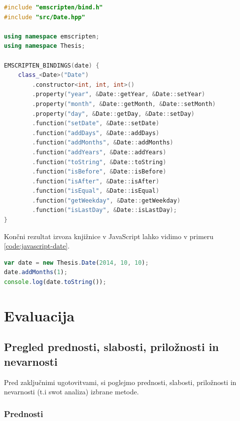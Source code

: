 \begin{lstlisting}[caption={C++ koda za izvoz funckionalnosti knjižnice v JavaScript razreda \texttt{Date}.}, label=code:emscripten-bindings, language=c++]
#include "emscripten/bind.h"
#include "src/Date.hpp"

using namespace emscripten;
using namespace Thesis;

EMSCRIPTEN_BINDINGS(date) {
    class_<Date>("Date")
        .constructor<int, int, int>()
        .property("year", &Date::getYear, &Date::setYear)
        .property("month", &Date::getMonth, &Date::setMonth)
        .property("day", &Date::getDay, &Date::setDay)
        .function("setDate", &Date::setDate)
        .function("addDays", &Date::addDays)
        .function("addMonths", &Date::addMonths)
        .function("addYears", &Date::addYears)
        .function("toString", &Date::toString)
        .function("isBefore", &Date::isBefore)
        .function("isAfter", &Date::isAfter)
        .function("isEqual", &Date::isEqual)
        .function("getWeekday", &Date::getWeekday)
        .function("isLastDay", &Date::isLastDay);
}
\end{lstlisting}

Končni rezultat izvoza knjižnice v JavaScript lahko vidimo v primeru \ref{code:javascript-date}.

\begin{lstlisting}[caption={Primer uporabe izvoženega razreda \texttt{Date} v JavaScript.}, label=code:javascript-date, language=JavaScript]
var date = new Thesis.Date(2014, 10, 10);
date.addMonths(1);
console.log(date.toString());
\end{lstlisting}


\chapter{Evaluacija}
\label{chap:evaluation}

\section{Pregled prednosti, slabosti, priložnosti in nevarnosti}

Pred zaključnimi ugotovitvami, si poglejmo prednosti, slabosti, priložnosti in nevarnosti (t.i \gls{swot} analiza) izbrane metode.

\subsection{Prednosti}


